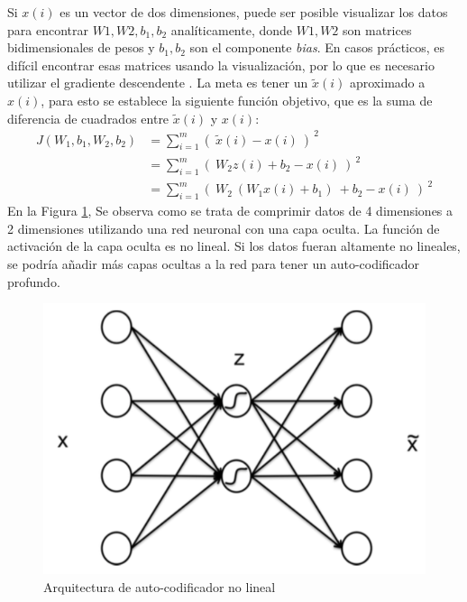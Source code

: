     Si $x(i)$ es un vector de dos dimensiones, puede ser posible visualizar los datos para encontrar $W1, W2, b_1, b_2$ analíticamente, donde $W1, W2$ son matrices bidimensionales de pesos y $b_1, b_2$ son el componente \textit{bias}. En casos prácticos, es difícil encontrar esas matrices usando la visualización, por lo que es necesario utilizar el gradiente descendente \cite{stochastic-gradient-tricks}. La meta es tener un $\tilde{x}(i)$ aproximado a $x(i)$, para esto se establece la siguiente función objetivo, que es la suma de diferencia de cuadrados entre $\tilde{x}(i)$ y $x(i)$:
    \begin{equation}
    \begin{aligned}
     J(W_1,b_1,W_2,b_2) & = \sum_{i=1}^m\left(\ \tilde{x}(i)-x(i)\ \right )^{\ 2} \\
      & = \sum_{i=1}^m\left(\ W_2z(i) + b_2-x(i)\ \right )^{\ 2}\\
     & = \sum_{i=1}^m\left(\ W_2 \ (W_1x(i)+b_1) \ + b_2-x(i)\ \right )^{\ 2}
    \end{aligned}
    \end{equation}
    En la Figura \ref{fig:aenco2}, Se observa como se trata de comprimir datos de 4 dimensiones a 2 dimensiones utilizando una red neuronal con una capa oculta. La función de activación de la capa oculta es no lineal. Si los datos fueran altamente no lineales, se podría añadir más capas ocultas a la red para tener un auto-codificador profundo.
    \begin{figure}[htp]
        \centering
        \includegraphics[scale=0.49]{chapter3/aenco2.png}
        \caption{Arquitectura de auto-codificador no lineal}
        \label{fig:aenco2}
    \end{figure}


